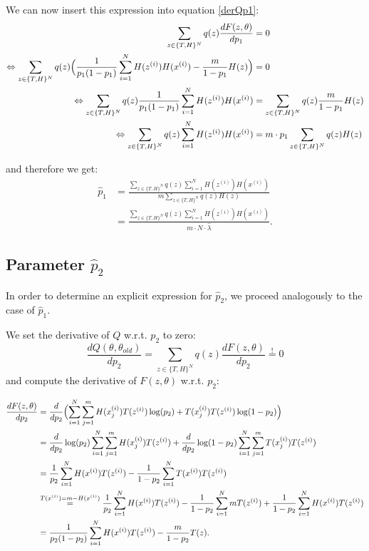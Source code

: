 \documentclass[10pt,a4paper]{article}
\begin{document}
We can now insert this expression into equation \ref{derQp1}:
\begin{align*}
\sum_{z\in \{T,H\}^N} q(z) \frac{dF(z,\theta)}{d p_1} &=0\\
\Leftrightarrow \sum_{z\in \{T,H\}^N} q(z)\Bigl ( \frac{1}{p_1(1-p_1)} \sum_{i=1}^N  H(z^{(i)}) H(x^{(i)}) - \frac{m}{1-p_1} H(z) \Bigr) &=0\\
\Leftrightarrow \sum_{z\in \{T,H\}^N} q(z) \frac{1}{p_1(1-p_1)} \sum_{i=1}^N  H(z^{(i)}) H(x^{(i)}) &=\sum_{z\in \{T,H\}^N} q(z) \frac{m}{1-p_1} H(z)\\
\Leftrightarrow \sum_{z\in \{T,H\}^N} q(z) \sum_{i=1}^N  H(z^{(i)}) H(x^{(i)}) &=m \cdot p_1 \sum_{z\in \{T,H\}^N} q(z) H(z)
\end{align*}
 
 and therefore we get:
 \begin{align*}
 \hat p_1 &=\frac{ \sum_{z\in \{T,H\}^N} q(z) \sum_{i=1}^N  H(z^{(i)}) H(x^{(i)})}{m\sum_{z\in \{T,H\}^N} q(z) H(z)}\\
 &=\frac{ \sum_{z\in \{T,H\}^N} q(z) \sum_{i=1}^N  H(z^{(i)}) H(x^{(i)})}{m \cdot N  \cdot \hat \lambda}.
 \end{align*}

\subsection*{Parameter $\hat p_2$}

In order to determine an explicit expression for $\hat p_2$, we proceed analogously to the case of $\hat p_1$.

We set the derivative of $Q$ w.r.t. $p_2$ to zero:
\begin{equation}\label{derQp2}
\frac{dQ(\theta,\theta_{old})}{d p_2}=\sum_{z\in \{T,H\}^N} q(z) \frac{dF(z,\theta)}{d p_2} \stackrel{!}{=}0
\end{equation}
and compute the derivative of $F(z,\theta)$ w.r.t. $p_2$:

\begin{align*}
\frac{dF(z,\theta)}{d p_2} &= \frac{d}{d p_2} \Bigl ( \sum_{i=1}^N \sum_{j=1}^m  H(x_j^{(i)})T(z^{(i)}) \log(p_2)+ T(x_j^{(i)})T(z^{(i)}) \log (1-p_2) \Bigr )\\
&= \frac{d}{d p_2} \log(p_2)\sum_{i=1}^N \sum_{j=1}^m  H(x_j^{(i)})T(z^{(i)}) +  \frac{d}{d p_2} \log (1-p_2) \sum_{i=1}^N \sum_{j=1}^m T(x_j^{(i)})T(z^{(i)})  \\
&= \frac{1}{p_2}\sum_{i=1}^N  H(x^{(i)})T(z^{(i)}) -  \frac{1}{1- p_2}\sum_{i=1}^N  T(x^{(i)})T(z^{(i)})  \\
&\stackrel{T(x^{(i)})=m-H(x^{(i)})}{=} \frac{1}{p_2}\sum_{i=1}^N  H(x^{(i)})T(z^{(i)}) -  \frac{1}{1- p_2}\sum_{i=1}^N  m T(z^{(i)}) + \frac{1}{1- p_2}\sum_{i=1}^N H(x^{(i)})T(z^{(i)}) \\
&= \frac{1}{p_2(1-p_2)}\sum_{i=1}^N  H(x^{(i)})T(z^{(i)}) -  \frac{m}{1- p_2} T(z).
\end{align*}
\end{document}
